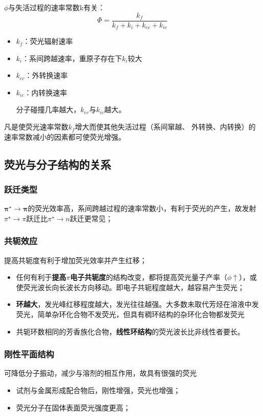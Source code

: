 $\phi$与失活过程的速率常数k有关：
\begin{equation}
	\Phi =\frac{k_{f}}{k_{f}+k_{i}+k_{ec}+k_{ic}}
\end{equation}
\begin{note}
	\begin{itemize}
		\item $k_{f}$：荧光辐射速率
		\item $k_{i}$：系间跨越速率，重原子存在下$k_{i}$较大
		\item $k_{ec}$：外转换速率
		\item $k_{ic}$：内转换速率
		
		分子碰撞几率越大，$k_{ec}$与$k_{ic}$越大。	
	\end{itemize}
\end{note}
凡是使荧光速率常数$k_{f}$增大而使其他失活过程（系间窜越、 外转换、内转换）的速率常数减小的因素都可使荧光增强。

\subsection{荧光与分子结构的关系}
\subsubsection{跃迁类型}
$\mathbf{\pi^{\star} \rightarrow \pi}$的荧光效率高，系间跨越过程的速率常数小，有利于荧光的产生，故发射 $\pi^{\star} \rightarrow \pi$跃迁比$\pi^{\star} \rightarrow n$跃迁更常见；

\subsubsection{共轭效应}
提高共轭度有利于增加荧光效率并产生红移；
\begin{itemize}
	\item 任何有利于\textbf{提高$\pi$电子共轭度}的结构改变，都将提高荧光量子产率（$\phi \uparrow$），或使荧光波长向长波长方向移动。即电子共轭程度越大，越容易产生荧光；
	\item \textbf{环越大}，发光峰红移程度越大，发光往往越强。大多数未取代芳烃在溶液中发荧光，简单杂环化合物不发荧光，但具有稠环结构的杂环化合物都发荧光
	\item 共轭环数相同的芳香族化合物，\textbf{线性环结构}的荧光波长比非线性者要长。
\end{itemize}

\subsubsection{刚性平面结构}
可降低分子振动，减少与溶剂的相互作用，故具有很强的荧光
\begin{itemize}
	\item 试剂与金属形成配合物后，刚性增强，荧光也增强；
	\item 荧光分子在固体表面荧光强度更高；
\end{itemize}
